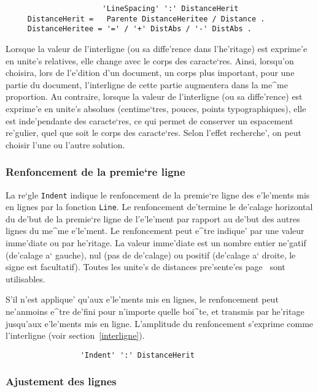 {\begin{verbatim}
                      'LineSpacing' ':' DistanceHerit
     DistanceHerit =   Parente DistanceHeritee / Distance .
     DistanceHeritee = '=' / '+' DistAbs / '-' DistAbs .
\end{verbatim}

Lorsque la valeur de l'interligne (ou sa diffe'rence dans l'he'ritage) est
exprime'e en unite's relatives, elle change avec le corps des caracte`res.
Ainsi, lorsqu'on choisira, lors de l'e'dition d'un document, un corps plus
important, pour une partie du document,
l'interligne de cette partie augmentera dans la me^me proportion.
Au contraire, lorsque la valeur de l'interligne (ou sa diffe'rence) est
exprime'e en unite's
absolues (centime`tres, pouces, points typographiques), elle est inde'pendante
des caracte`res, ce qui permet de conserver un espacement re'gulier, quel que
soit le corps des caracte`res. Selon l'effet recherche', on peut choisir
l'une ou l'autre solution.

\subsubsection{Renfoncement de la premie`re ligne}

La re`gle {\tt Indent} indique le renfoncement de la premie`re ligne des
e'le'ments mis en lignes par la fonction {\tt Line}. Le renfoncement
de'termine le de'calage horizontal du de'but de la premie`re ligne de l'e'le'ment
par rapport au de'but des autres lignes du me^me e'le'ment. Le renfoncement peut e^tre
indique' par une valeur imme'diate ou par he'ritage. La valeur imme'diate
est un nombre entier ne'gatif (de'calage a` gauche), nul (pas de de'calage) ou
positif (de'calage a` droite, le signe est facultatif). Toutes les unite's
de distances pre'sente'es page~\pageref{unites} sont utilisables.

S'il n'est applique' qu'aux e'le'ments mis en lignes, le renfoncement peut
ne'anmoins e^tre de'fini pour n'importe quelle boi^te, et transmis par
he'ritage jusqu'aux e'le'ments mis en ligne. L'amplitude du renfoncement
s'exprime comme l'interligne (voir section~\ref{interligne}).

\begin{verbatim}
                 'Indent' ':' DistanceHerit
\end{verbatim}

\subsubsection{Ajustement des lignes}

}

